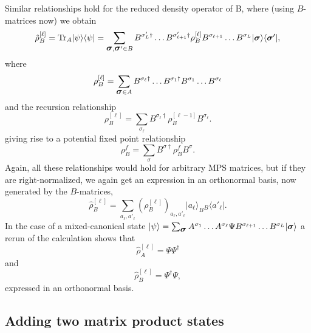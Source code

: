 \documentclass[a4paper,10pt,oneside,onecolumn,1p,times]{elsarticle}
\newcommand{\tr}{{\rm Tr }}
\newcommand{\bra}[1]{\mbox{$\langle #1  |$}}
\newcommand{\ket}[1]{\mbox{$| #1  \rangle$}}
\newcommand{\fat}[1]{\mbox{\boldmath$#1$\unboldmath}}	%
\begin{document}
Similar relationships hold for the reduced density operator of B, where (using $B$-matrices now) we obtain
\begin{equation}
\hat{\rho}_B^{[\ell]} = \tr_A \ket{\psi}\bra{\psi} = \sum_{\fat{\sigma},\fat{\sigma}'\in B} 
B^{\sigma'_L\dagger} \ldots B^{\sigma'_{\ell+1}\dagger} \rho_B^{[\ell]} B^{\sigma_{\ell+1}} \ldots B^{\sigma_L} \ket{\fat{\sigma}} \bra{\fat{\sigma}'} ,
\end{equation}
where
\begin{equation}
\rho_B^{[\ell]} =  \sum_{\fat{\sigma}\in A} B^{\sigma_{\ell}\dagger} \ldots B^{\sigma_1\dagger} B^{\sigma_1} \ldots B^{\sigma_{\ell} }
\end{equation}
and the recursion relationship
\begin{equation}
\rho_B^{[\ell]} = \sum_{\sigma_\ell} B^{\sigma_\ell\dagger} \rho_B^{[\ell-1]} B^{\sigma_\ell} .
\label{eq:rhobrecursion}
\end{equation}
giving rise to a potential fixed point relationship
\begin{equation}
\rho_B^f = \sum_{\sigma} B^{\sigma\dagger} \rho_B^{f} B^{\sigma} .
\end{equation}
Again, all these relationships would hold for arbitrary MPS matrices, but if they are right-normalized, we again get an expression in an orthonormal basis, now generated by the $B$-matrices,
\begin{equation}
\hat{\rho}_B^{[\ell]} = \sum_{a_\ell, a'_\ell} (\rho_B^{[\ell]})_{a_\ell, a'_\ell} \ket{a_\ell}_B \phantom{{}}_B\bra{a'_\ell} .
\end{equation}
In the case of a mixed-canonical state $\ket{\psi}=\sum_{\fat{\sigma}} A^{\sigma_1}\ldots A^{\sigma_\ell}\Psi B^{\sigma_{\ell+1}} \ldots B^{\sigma_L} \ket{\fat{\sigma}}$ a rerun of the calculation shows that 
\begin{equation}
\hat{\rho}^{[\ell]}_A = \Psi \Psi^\dagger
\end{equation}
and
\begin{equation}
\hat{\rho}^{[\ell]}_B = \Psi^\dagger\Psi ,
\end{equation}
expressed in an orthonormal basis.

\subsection{Adding two matrix product states}
\end{document}
